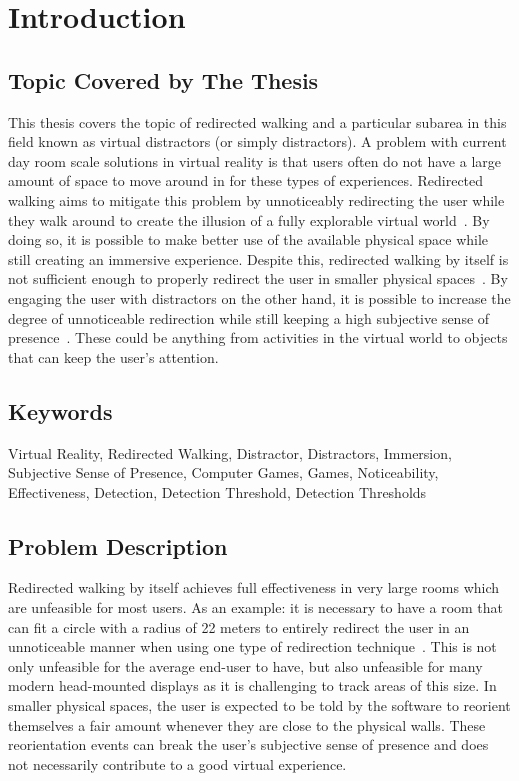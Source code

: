\chapter{Introduction}
\label{chap:introduction}

\section{Topic Covered by The Thesis}
This thesis covers the topic of redirected walking and a particular subarea in this field known as virtual distractors (or simply distractors). A problem with current day room scale solutions in virtual reality is that users often do not have a large amount of space to move around in for these types of experiences. Redirected walking aims to mitigate this problem by unnoticeably redirecting the user while they walk around to create the illusion of a fully explorable virtual world~\cite{razzaque2001redirected}. By doing so, it is possible to make better use of the available physical space while still creating an immersive experience. Despite this, redirected walking by itself is not sufficient enough to properly redirect the user in smaller physical spaces~\cite{5072212,azmandian2015physical}. By engaging the user with distractors on the other hand, it is possible to increase the degree of unnoticeable redirection while still keeping a high subjective sense of presence~\cite{peck2009evaluation}. These could be anything from activities in the virtual world to objects that can keep the user's attention.  


\section{Keywords}
Virtual Reality, Redirected Walking, Distractor, Distractors, Immersion, Subjective Sense of Presence, Computer Games, Games, Noticeability, Effectiveness, Detection, Detection Threshold, Detection Thresholds

\section{Problem Description}
Redirected walking by itself achieves full effectiveness in very large rooms which are unfeasible for most users. As an example: it is necessary to have a room that can fit a circle with a radius of 22 meters to entirely redirect the user in an unnoticeable manner when using one type of redirection technique~\cite{5072212, azmandian2015physical}. This is not only unfeasible for the average end-user to have, but also unfeasible for many modern head-mounted displays as it is challenging to track areas of this size. In smaller physical spaces, the user is expected to be told by the software to reorient themselves a fair amount whenever they are close to the physical walls. These reorientation events can break the user's subjective sense of presence and does not necessarily contribute to a good virtual experience. 

